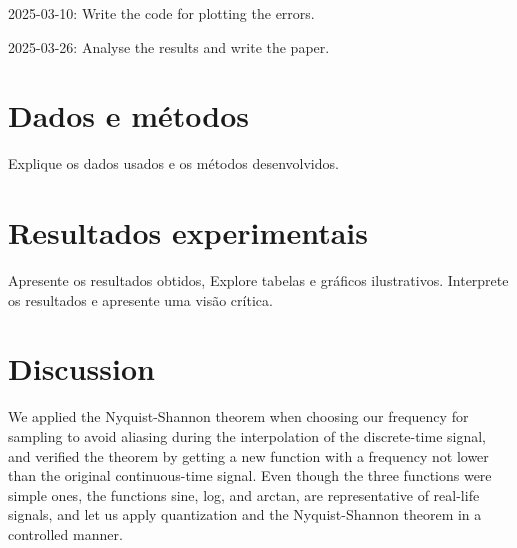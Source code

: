 \documentclass{article}
\begin{document}
2025-03-10: Write the code for plotting the errors.  

2025-03-26: Analyse the results and write the paper.  

\section{Dados e métodos}

Explique os dados usados e os métodos desenvolvidos.

\section{Resultados experimentais}

Apresente os resultados obtidos, Explore tabelas e gráficos ilustrativos. Interprete os resultados e apresente uma visão crítica.

\section{Discussion}

We applied the Nyquist-Shannon theorem when choosing our frequency for sampling to avoid aliasing during the interpolation of the discrete-time signal, and verified the theorem by getting a new function with a frequency not lower than the original continuous-time signal. 
Even though the three functions were simple ones, the functions sine, log, and arctan, are representative of real-life signals, and let us apply quantization and the Nyquist-Shannon theorem in a controlled manner.  
\end{document}
